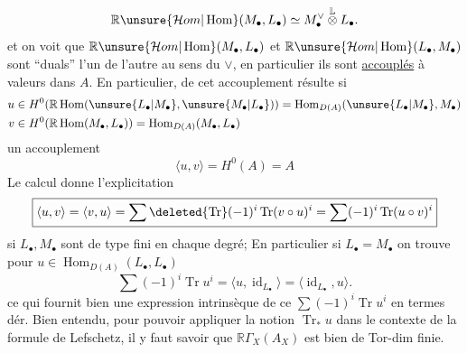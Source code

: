 \[
\mathbb R\unsure{\mathcal Hom|\operatorname{Hom}}(M_\bullet,L_\bullet)\simeq M_\bullet^\vee\overset{\mathbb L}{\otimes}L_\bullet.
\]
et on voit que $\mathbb R\unsure{\mathcal Hom|\operatorname{Hom}}(M_\bullet,L_\bullet)$ et $\mathbb R\unsure{\mathcal Hom|\operatorname{Hom}}(L_\bullet,M_\bullet)$
sont ``duals'' l'un de l'autre au sens
du $\vee$, en particulier ils sont
\uline{accouplés} à valeurs dans $A$. En
particulier, de cet accouplement résulte
si
\[
\begin{aligned}
u&\in H^0(\mathbb R\operatorname{Hom}(\unsure{L_\bullet|M_\bullet},\unsure{M_\bullet|L_\bullet}))=\operatorname{Hom}_{D(A)}(\unsure{L_\bullet|M_\bullet},M_\bullet)\\
v&\in H^0(\mathbb R\operatorname{Hom}(M_\bullet,L_\bullet))=\operatorname{Hom}_{D(A)}(M_\bullet,L_\bullet)
\end{aligned}
\]
un accouplement
\[
\langle u,v\rangle=H^0(A)=A
\]
Le calcul donne l'explicitation
\[
\boxed{\langle u,v\rangle=\langle v,u\rangle=\sum\deleted{\operatorname{Tr}}(-1)^i\operatorname{Tr}(v\circ u)^i=\sum(-1)^i\operatorname{Tr}(u\circ v)^i}
\]
si $L_\bullet,M_\bullet$ sont  de type fini en
chaque degré; 
En particulier si $L_\bullet=M_\bullet$
on trouve pour $u\in\operatorname{Hom}_{D(A)}(L_\bullet,L_\bullet)$
\[
\boxed{\sum(-1)^i\operatorname{Tr}u^i=\langle u,\operatorname{id}_{L_\bullet}\rangle=\langle\operatorname{id}_{L_\bullet},u\rangle.}
\]
ce qui fournit bien une expression
intrinsèque de ce $\sum(-1)^i\operatorname{Tr}u^i$ en termes dér.
Bien entendu, pour pouvoir appliquer la notion
$\operatorname{Tr}_*u$ dans le contexte de la formule de Lefschetz, il y
faut savoir que $\mathbb R\Gamma_X(A_X)$ est bien  de Tor-dim finie.
